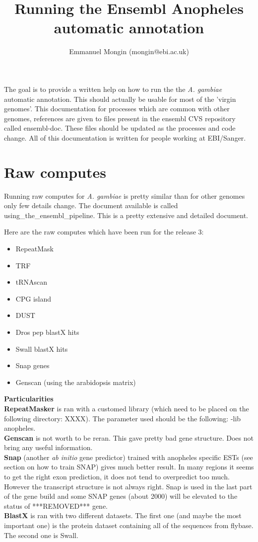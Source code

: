 \documentclass[a4paper,10pt]{article}
\title{Running the Ensembl Anopheles automatic annotation}
\author{Emmanuel Mongin (mongin@ebi.ac.uk)}
\begin{document}
\maketitle


The goal is to provide a written help on how to run the the \textit{A. gambiae} automatic annotation. This should actually be usable for most of the 'virgin genomes'. This documentation for processes which are common with other genomes, references are given to files present in the ensembl CVS repository called ensembl-doc. These files should be updated as the processes and code change. All of this documentation is written for people working at EBI/Sanger.

\section{Raw computes}
Running raw computes for \textit{A. gambiae} is pretty similar than for other genomes only few details change.
The document available is called using\_the\_ensembl\_pipeline. This is a pretty extensive and detailed document.

Here are the raw computes which have been run for the release 3:
\begin{itemize}
\item RepeatMask
\item TRF
\item tRNAscan
\item CPG island
\item DUST
\item Dros pep blastX hits
\item Swall blastX hits
\item Snap genes
\item Genscan (using the arabidopsis matrix)
\end{itemize}

\textbf{Particularities}\\
\textbf{RepeatMasker} is ran with a customed library (which need to be placed on the following directory: XXXX). The parameter used should be the following: \--lib anopheles.\\
\textbf{Genscan} is not worth to be reran. This gave pretty bad gene structure. Does not bring any useful information.\\
\textbf{Snap} (another \textit{ab initio} gene predictor) trained with anopheles specific ESTs (see section on how to train SNAP) gives much better result. In many regions it seems to get the right exon prediction, it does not tend to overpredict too much. However the transcript structure is not always right. Snap is used in the last part of the gene build and some SNAP genes (about 2000) will be elevated to the status of ***REMOVED*** gene.\\
\textbf{BlastX} is ran with two different datasets. The first one (and maybe the most important one) is the protein dataset containing all of the sequences from flybase. The second one is Swall.\\
\end{document}
